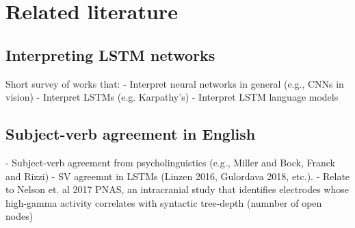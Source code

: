
\section{Related literature}

\subsection{Interpreting LSTM networks}
Short survey of works that:
- Interpret neural networks in general (e.g., CNNs in vision)
- Interpret LSTMs (e.g. Karpathy's)
- Interpret LSTM language models

\subsection{Subject-verb agreement in English}
- Subject-verb agreement from psycholinguistics (e.g., Miller and Bock, Franck and Rizzi)
- SV agreemnt in LSTMs (Linzen 2016, Gulordava 2018, etc.). 
- Relate to Nelson et. al 2017 PNAS, an intracranial study that identifies electrodes whose high-gamma activity correlates with syntactic tree-depth (numnber of open nodes)
